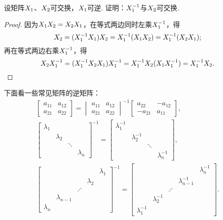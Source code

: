 \begin{example}
设矩阵\(X_1\)、\(X_2\)可交换，\(X_1\)可逆.
证明：\(X_1^{-1}\)与\(X_2\)可交换.
\begin{proof}
因为\(X_1X_2 = X_2X_1\)，在等式两边同时左乘\(X_1^{-1}\)，得\[
	X_2 = (X_1^{-1}X_1)X_2 = X_1^{-1}(X_1X_2) = X_1^{-1}(X_2X_1);
\]
再在等式两边右乘\(X_1^{-1}\)，得\[
	X_2X_1^{-1} = (X_1^{-1}X_2X_1)X_1^{-1} = X_1^{-1}X_2(X_1X_1^{-1}) = X_1^{-1}X_2.
	\qedhere
\]
\end{proof}
\end{example}

\begin{example}
下面看一些常见矩阵的逆矩阵：\begin{gather*}
	\begin{bmatrix}
		a_{11} & a_{12} \\
		a_{21} & a_{22}
	\end{bmatrix}
	= \begin{vmatrix}
		a_{11} & a_{12} \\
		a_{21} & a_{22}
	\end{vmatrix}^{-1}
	\begin{bmatrix}
		a_{22} & -a_{12} \\
		-a_{21} & a_{11}
	\end{bmatrix}, \\
	\begin{bmatrix}
		\lambda_1 \\
		& \lambda_2 \\
		&& \ddots \\
		&&& \lambda_n
	\end{bmatrix}^{-1}
	= \begin{bmatrix}
		\lambda_1^{-1} \\
		& \lambda_2^{-1} \\
		&& \ddots \\
		&&& \lambda_n^{-1}
	\end{bmatrix}, \\
	\begin{bmatrix}
		& & & & \lambda_1 \\
		& & & \lambda_2 \\
		& & \iddots \\
		& \lambda_{n-1} \\
		\lambda_n
	\end{bmatrix}^{-1}
	= \begin{bmatrix}
		& & & & \lambda_n^{-1} \\
		& & & \lambda_{n-1}^{-1} \\
		& & \iddots \\
		& \lambda_2^{-1} \\
		\lambda_1^{-1}
	\end{bmatrix}.
\end{gather*}
\end{example}

